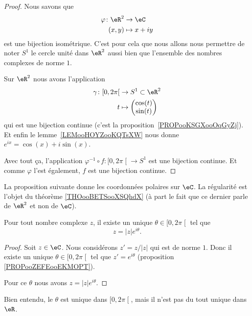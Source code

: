 \begin{proof}
	Nous savons que
	\begin{equation}
		\begin{aligned}
			\varphi\colon \eR^2 & \to \eC      \\
			(x,y)               & \mapsto x+iy
		\end{aligned}
	\end{equation}
	est une bijection isométrique. C'est pour cela que nous allons nous permettre de noter \( S^1\) le cercle unité dans \( \eR^2\) aussi bien que l'ensemble des nombres complexes de norme \( 1\).

	Sur \( \eR^2\) nous avons l'application
	\begin{equation}
		\begin{aligned}
			\gamma\colon \mathopen[ 0 , 2\pi \mathclose[ & \to S^1\subset \eR^2               \\
			t                                            & \mapsto \begin{pmatrix}
				\cos(t) \\
				\sin(t)
			\end{pmatrix}
		\end{aligned}
	\end{equation}
	qui est une bijection continue (c'est la proposition~\ref{PROPooKSGXooOqGyZj}). Et enfin le lemme~\ref{LEMooHOYZooKQTsXW} nous donne \(  e^{ix}=\cos(x)+i\sin(x)\).

	Avec tout ça, l'application \( \varphi^{-1}\circ f\colon \mathopen[ 0 , 2\pi \mathclose[\to S^1 \) est une bijection continue. Et comme \( \varphi\) l'est également, \( f\) est une bijection continue.
\end{proof}

La proposition suivante donne les coordonnées polaires sur \( \eC\). La régularité est l'objet du théorème \ref{THOooBETSooXSQhdX} (à part le fait que ce dernier parle de \( \eR^2\) et non de \( \eC\)).
\begin{proposition}     \label{PROPooRFMKooURhAQJ}
	Pour tout nombre complexe \( z\), il existe un unique \( \theta\in\mathopen[ 0 , 2\pi \mathclose[\) tel que
	\begin{equation}
		z=| z | e^{i\theta}.
	\end{equation}
\end{proposition}

\begin{proof}
	Soit \( z\in \eC\). Nous considérons \( z'=z/| z |\) qui est de norme \( 1\). Donc il existe un unique \( \theta\in\mathopen[ 0 , 2\pi \mathclose[\) tel que \( z'= e^{i\theta}\) (proposition \ref{PROPooZEFEooEKMOPT}).

	Pour ce \( \theta\) nous avons \( z=| z | e^{i\theta}\).
\end{proof}
Bien entendu, le \( \theta\) est unique dans \( \mathopen[ 0 , 2\pi \mathclose[\), mais il n'est pas du tout unique dans \( \eR\).

